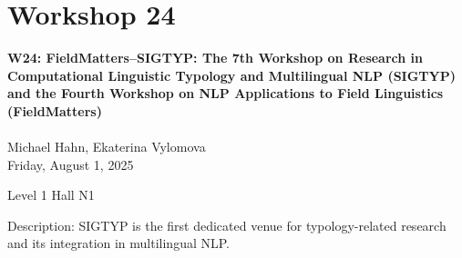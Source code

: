 \clearpage


\section[W24: FieldMatters–SIGTYP: The 7th Workshop on Research in Computational Linguistic Typology and Multilingual NLP (SIGTYP) and the Fourth Workshop on NLP Applications to Field Linguistics (FieldMatters)]{Workshop 24}
\label{workshop_24}

\begin{center}
    {\Large \textbf{W24: FieldMatters–SIGTYP: The 7th Workshop on Research in Computational Linguistic Typology and Multilingual NLP (SIGTYP) and the Fourth Workshop on NLP Applications to Field Linguistics (FieldMatters)}}\\
    
\\

Michael Hahn, Ekaterina Vylomova\\

    Friday, August 1, 2025

 Level 1 Hall N1
    
\end{center}

Description: SIGTYP is the first dedicated venue for typology-related research and its integration in multilingual NLP.

